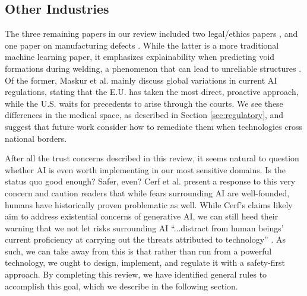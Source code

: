\documentclass[authoryear,preprint,12pt]{elsarticle}
\begin{document}
\subsection{Other Industries}
The three remaining papers in our review included two legal/ethics papers
\cite{cerfIfYouWorry2023, maskurReimaginingCriminalLiability2025}, and
one paper on manufacturing defects \cite{baruahOptimisedMachineLearning2023}.
While the latter is a more traditional machine learning paper, it emphasizes
explainability when predicting void formations during welding, a phenomenon that
can lead to unreliable structures \cite{baruahOptimisedMachineLearning2023}. Of
the former, Maskur et al. \cite{maskurReimaginingCriminalLiability2025} mainly
discuss global variations in current AI regulations, stating that the E.U. has
taken the most direct, proactive approach, while the U.S. waits for precedents
to arise through the courts. We see these differences in the medical space, as
described in Section \ref{sec:regulatory}, and suggest that future work consider
how to remediate them when technologies cross national borders.

After all the trust concerns described in this review, it seems natural to
question whether AI is even worth implementing in our most sensitive domains. Is
the status quo good enough? Safer, even? Cerf et al. \cite{cerfIfYouWorry2023}
present a response to this very concern and caution readers that while fears
surrounding AI are well-founded, humans have historically proven problematic as
well. While Cerf's claims likely aim to address existential concerns of
generative AI, we can still heed their warning that we not let risks surrounding
AI ``...distract from human beings' current proficiency at carrying out the
threats attributed to technology'' \cite{cerfIfYouWorry2023}. As such, we can
take away from this is that rather than run from a powerful technology, we ought
to design, implement, and regulate it with a safety-first approach. By
completing this review, we have identified general rules to accomplish this
goal, which we describe in the following section. 
\end{document}
